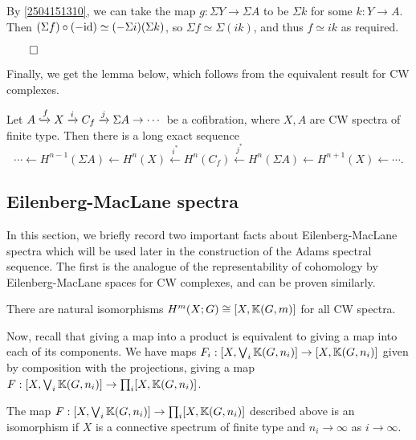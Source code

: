 \documentclass{MetricNotes2023}
\def\bb{\ensuremath\mathbb}
\def\xinj{\ensuremath\xhookrightarrow}
\def\id{\ensuremath\text{id}}
\def\done{\begin{flushright}\vspace{-4.35ex}\(\qed\)\end{flushright}}
\begin{document}
\begin{ourproof}
By \ref{2504151310}, we can take the map \(g : \Sigma Y \to \Sigma A\) to be \(\Sigma k\) for some \(k : Y \to A\). Then \((\Sigma f)\circ (-\id) \simeq (-\Sigma i)(\Sigma k)\), so \(\Sigma f\simeq \Sigma(ik)\), and thus \(f \simeq ik\) as required.\done
\end{ourproof}

Finally, we get the lemma below, which follows from the equivalent result for CW complexes. 

\begin{lemma}\label{2504140954}
Let \(A \xinj f X \xrightarrow{i} C_f \xrightarrow{j} \Sigma A \to \cdots\) be a cofibration, where \(X, A\) are CW spectra of finite type. Then there is a long exact sequence 
\[\cdots \leftarrow H^{n-1}(\Sigma A) \leftarrow H^n(X) \xleftarrow{i^*} H^n(C_f) \xleftarrow{j^*} H^n(\Sigma A)\leftarrow H^{n+1}(X) \leftarrow \cdots.\]
\end{lemma}

\subsection{Eilenberg-MacLane spectra}\label{2504291245}

In this section, we briefly record two important facts about Eilenberg-MacLane spectra which will be used later in the construction of the Adams spectral sequence. The first is the analogue of the representability of cohomology by Eilenberg-MacLane spaces for CW complexes, and can be proven similarly.

\begin{theorem}\label{2503221328}
There are natural isomorphisms \(H^m(X;G)\cong [X,\bb{K}(G,m)]\) for all CW spectra.
\end{theorem}

Now, recall that giving a map into a product is equivalent to giving a map into each of its components. We have maps \(F_i : [X, \bigvee_i \bb{K}(G,n_i)]\to [X,\bb{K}(G,n_i)]\) given by composition with the projections, giving a map \(F : [X, \bigvee_i \bb{K}(G,n_i)]\to \prod_i [X,\bb{K}(G,n_i)]\).

\begin{proposition}\label{2503231218}
The map \(F : [X, \bigvee_i \bb{K}(G,n_i)]\to \prod_i [X,\bb{K}(G,n_i)]\) described above is an isomorphism if \(X\) is a connective spectrum of finite type and \(n_i\to \infty\) as \(i\to\infty\). 
\end{proposition}
\end{document}
